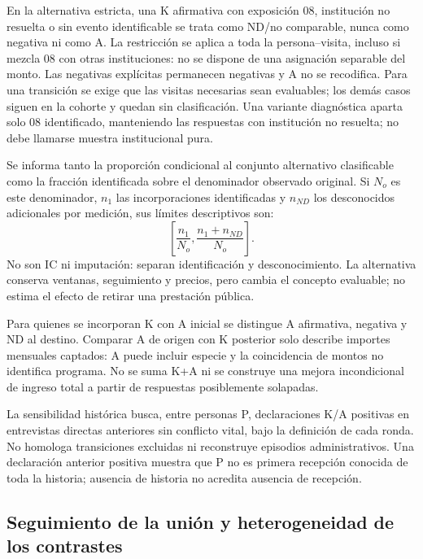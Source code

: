 En la alternativa estricta, una K afirmativa con exposición 08, institución
no resuelta o sin evento identificable se trata como ND/no comparable, nunca
como negativa ni como A. La restricción se aplica a toda la persona--visita,
incluso si mezcla 08 con otras instituciones: no se dispone de una asignación
separable del monto. Las negativas explícitas permanecen negativas y A no se
recodifica. Para una transición se exige que las visitas necesarias sean
evaluables; los demás casos siguen en la cohorte y quedan sin clasificación.
Una variante diagnóstica aparta solo 08 identificado, manteniendo las respuestas
con institución no resuelta; no debe llamarse muestra institucional pura.

Se informa tanto la proporción condicional al conjunto alternativo clasificable
como la fracción identificada sobre el denominador observado original. Si
$N_o$ es este denominador, $n_1$ las incorporaciones identificadas y $n_{ND}$
los desconocidos adicionales por medición, sus límites descriptivos son:
\begin{equation}
 \left[\frac{n_1}{N_o},\frac{n_1+n_{ND}}{N_o}\right].
 \label{eq:cotas-medicion}
\end{equation}
No son IC ni imputación: separan identificación y desconocimiento. La
alternativa conserva ventanas, seguimiento y precios, pero cambia el concepto
evaluable; no estima el efecto de retirar una prestación pública.

Para quienes se incorporan K con A inicial se distingue A afirmativa,
negativa y ND al destino. Comparar A de origen con K posterior solo describe
importes mensuales captados: A puede incluir especie y la coincidencia de
montos no identifica programa. No se suma K+A ni se construye una mejora
incondicional de ingreso total a partir de respuestas posiblemente solapadas.

La sensibilidad histórica busca, entre personas P, declaraciones K/A positivas
en entrevistas directas anteriores sin conflicto vital, bajo la definición
de cada ronda. No homologa transiciones excluidas ni reconstruye episodios
administrativos. Una declaración anterior positiva muestra que P no es primera
recepción conocida de toda la historia; ausencia de historia no acredita
ausencia de recepción.

\subsection{Seguimiento de la unión y heterogeneidad de los contrastes}

